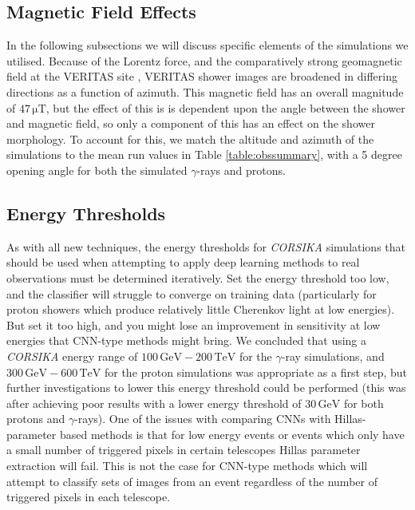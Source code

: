 \subsection{Magnetic Field Effects}
In the following subsections we will discuss specific elements of the simulations we utilised. Because of the Lorentz force, and the comparatively strong geomagnetic field at the VERITAS site \cite{kraus}, VERITAS shower images are broadened in differing directions as a function of azimuth. This magnetic field has an overall magnitude of $\mathrm{47\,\mu T}$, but the effect of this is is dependent upon the angle between the shower and magnetic field, so only a component of this has an effect on the shower morphology.  To account for this, we match the altitude and azimuth of the simulations to the mean run values in Table \ref{table:obssummary}, with a 5 degree opening angle for both the simulated $\gamma$-rays and protons.

\subsection{Energy Thresholds}
As with all new techniques, the energy thresholds for \textit{CORSIKA} simulations that should be used when attempting to apply deep learning methods to real observations must be determined iteratively. Set the energy threshold too low, and the classifier will struggle to converge on training data (particularly for proton showers which produce relatively little Cherenkov light at low energies). But set it too high, and you might lose an improvement in sensitivity at low energies that CNN-type methods might bring. We concluded that using a \textit{CORSIKA} energy range of $\mathrm{100\,GeV-200\,TeV}$ for the $\gamma$-ray simulations, and $\mathrm{300\,GeV-600\,TeV}$ for the proton simulations was appropriate as a first step, but further investigations to lower this energy threshold could be performed (this was after achieving poor results with a lower energy threshold of $\mathrm{30\,GeV}$ for both protons and $\gamma$-rays). One of the issues with comparing CNNs with Hillas-parameter based methods is that for low energy events or events which only have a small number of triggered pixels in certain telescopes Hillas parameter extraction will fail. This is not the case for CNN-type methods which will attempt to classify sets of images from an event regardless of the number of triggered pixels in each telescope.

